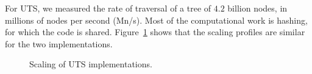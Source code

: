 For UTS, we measured the rate of traversal of a tree of $4.2$ billion nodes, in
millions of nodes per second (Mn/s). Most of the computational work is hashing, for
which the code is shared. Figure~\ref{fig:uts-scaling} shows that the scaling
profiles are similar for the two implementations. 

\begin{figure}
\vspace{-0.3cm}
\hspace{-0.2cm}
\begingroup\graphicspath{{figures/}}\endgroup
\vspace{-0.2cm}
\caption{Scaling of UTS implementations.}
\label{fig:uts-scaling}
\end{figure}



